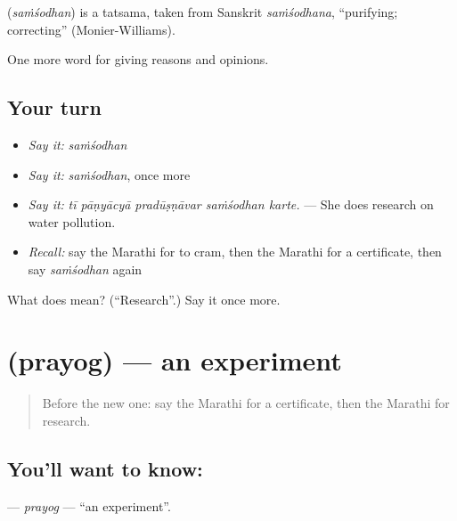 \begin{cousinweb}
\textbf{} (\emph{saṁśodhan}) is a tatsama, taken from Sanskrit \emph{saṁśodhana}, \textquotedblleft{}purifying; correcting\textquotedblright{} (Monier-Williams).
\end{cousinweb}

\begin{grammarlens}[title={What you've built}]
One more word for giving reasons and opinions.
\end{grammarlens}

\subsection*{Your turn}
\begin{itemize}
\raggedright
  \item \emph{Say it:} \emph{saṁśodhan}
  \item \emph{Say it:} \emph{saṁśodhan}, once more
  \item \emph{Say it:} \emph{tī pāṇyācyā pradūṣṇāvar saṁśodhan karte.} — She does research on water pollution.
  \item \emph{Recall:} say the Marathi for to cram, then the Marathi for a certificate, then say \emph{saṁśodhan} again
\end{itemize}

\begin{tcolorbox}[breakable,colback=teal!4,colframe=teal!35!black,title={Before you move on}]
What does  mean? (\textquotedblleft{}Research\textquotedblright{}.) Say it once more.
\end{tcolorbox}
\section[\texorpdfstring{\mr{प्रयोग} (prayog)}{प्रयोग (prayog)}]{ (prayog) — an experiment}

\label{lesson:MR-C372-prayog}



\begin{quote}
Before the new one: say the Marathi for a certificate, then the Marathi for research.
\end{quote}

\subsection*{You'll want to know: }
\textbf{} — \emph{prayog} — \textquotedblleft{}an experiment\textquotedblright{}.


